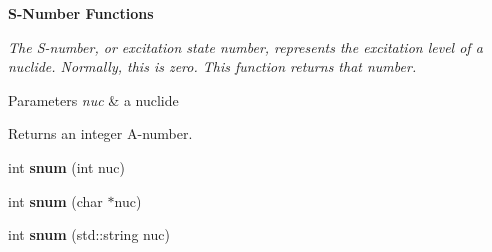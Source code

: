 \begin{Indent}{\bf S-\/\+Number Functions}\par
{\em The S-\/number, or excitation state number, represents the excitation level of a nuclide. Normally, this is zero. This function returns that number. 
\begin{DoxyParams}{Parameters}
{\em nuc} & a nuclide \\
\hline
\end{DoxyParams}
\begin{DoxyReturn}{Returns}
an integer A-\/number. 
\end{DoxyReturn}
}\begin{DoxyCompactItemize}
\item 
\hypertarget{namespacepyne_1_1nucname_ad48fe72b30c8cdcc16156f4a4991af6b}{int {\bfseries snum} (int nuc)}\label{namespacepyne_1_1nucname_ad48fe72b30c8cdcc16156f4a4991af6b}

\item 
\hypertarget{namespacepyne_1_1nucname_a870b2829a3740e431f2724afba7061c3}{int {\bfseries snum} (char $\ast$nuc)}\label{namespacepyne_1_1nucname_a870b2829a3740e431f2724afba7061c3}

\item 
\hypertarget{namespacepyne_1_1nucname_a561dc9f333b1f890793caa4d7f6eb46b}{int {\bfseries snum} (std\+::string nuc)}\label{namespacepyne_1_1nucname_a561dc9f333b1f890793caa4d7f6eb46b}

\end{DoxyCompactItemize}
\end{Indent}

